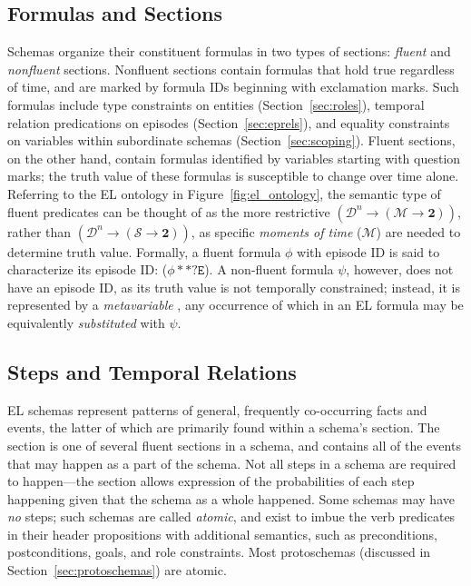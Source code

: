 \subsection{Formulas and Sections}
Schemas organize their constituent formulas in two types of sections: \textit{fluent} and \textit{nonfluent} sections.
Nonfluent sections contain formulas that hold true regardless of time, and are marked by formula IDs beginning with exclamation marks.
Such formulas include type constraints on entities (Section~\ref{sec:roles}), temporal relation predications on episodes (Section~\ref{sec:eprels}), and equality constraints on variables within subordinate schemas (Section~\ref{sec:scoping}).
Fluent sections, on the other hand, contain formulas identified by variables starting with question marks; the truth value of these formulas is susceptible to change over time alone.
Referring to the EL ontology in Figure~\ref{fig:el_ontology}, the semantic type of fluent predicates can be thought of as the more restrictive $(\mathcal{D}^{n} \rightarrow (\mathcal{M} \rightarrow \textbf{2}))$, rather than $(\mathcal{D}^{n} \rightarrow (\mathcal{S} \rightarrow \textbf{2}))$, as specific \textit{moments of time} ($\mathcal{M}$) are needed to determine truth value.
Formally, a fluent formula $\phi$ with episode ID  is said to characterize its episode ID: ($\phi ** \texttt{?E}$).
A non-fluent formula $\psi$, however, does not have an episode ID, as its truth value is not temporally constrained; instead, it is represented by a \textit{metavariable} , any occurrence of which in an EL formula may be equivalently \textit{substituted} with $\psi$.

\subsection{Steps and Temporal Relations}
\label{sec:steps}
EL schemas represent patterns of general, frequently co-occurring facts and events, the latter of which are primarily found within a schema's  section.
The  section is one of several fluent sections in a schema, and contains all of the events that may happen as a part of the schema.
Not all steps in a schema are required to happen---the  section allows expression of the probabilities of each step happening given that the schema as a whole happened.
Some schemas may have \textit{no} steps; such schemas are called \textit{atomic}, and exist to imbue the verb predicates in their header propositions with additional semantics, such as preconditions, postconditions, goals, and role constraints.
Most protoschemas (discussed in Section~\ref{sec:protoschemas}) are atomic.

